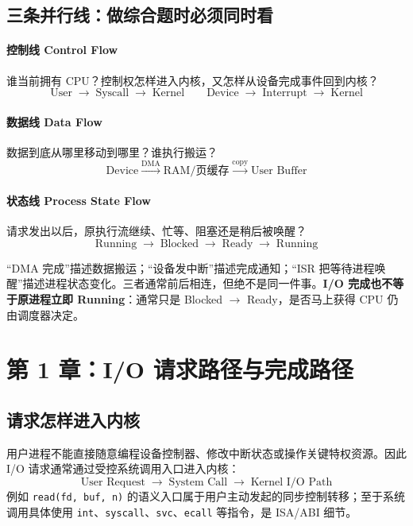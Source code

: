 \documentclass[UTF8,fontset=fandol,11pt,a4paper]{ctexart}
\newcommand{\kw}[1]{\textbf{#1}}
\newcommand{\code}[1]{\texttt{#1}}
\newcommand{\arr}{\;\longrightarrow\;}
\begin{document}
\subsection{三条并行线：做综合题时必须同时看}

\paragraph{控制线 Control Flow}
谁当前拥有 CPU？控制权怎样进入内核，又怎样从设备完成事件回到内核？
\[
\text{User}\arr\text{Syscall}\arr\text{Kernel}\qquad
\text{Device}\arr\text{Interrupt}\arr\text{Kernel}
\]

\paragraph{数据线 Data Flow}
数据到底从哪里移动到哪里？谁执行搬运？
\[
\text{Device}\xrightarrow{\text{DMA}}\text{RAM/页缓存}
\xrightarrow{\text{copy}}\text{User Buffer}
\]

\paragraph{状态线 Process State Flow}
请求发出以后，原执行流继续、忙等、阻塞还是稍后被唤醒？
\[
\text{Running}\arr\text{Blocked}\arr\text{Ready}\arr\text{Running}
\]

\begin{warn}[三条线最常见的混淆]
“DMA 完成”描述数据搬运；“设备发中断”描述完成通知；“ISR 把等待进程唤醒”描述进程状态变化。三者通常前后相连，但绝不是同一件事。\kw{I/O 完成也不等于原进程立即 Running}：通常只是 Blocked $\to$ Ready，是否马上获得 CPU 仍由调度器决定。
\end{warn}

\section{第 1 章：I/O 请求路径与完成路径}

\subsection{请求怎样进入内核}
用户进程不能直接随意编程设备控制器、修改中断状态或操作关键特权资源。因此 I/O 请求通常通过受控系统调用入口进入内核：
\[
\boxed{\text{User Request}\arr\text{System Call}\arr\text{Kernel I/O Path}}
\]
例如 \code{read(fd, buf, n)} 的语义入口属于用户主动发起的同步控制转移；至于系统调用具体使用 \code{int}、\code{syscall}、\code{svc}、\code{ecall} 等指令，是 ISA/ABI 细节。
\end{document}
